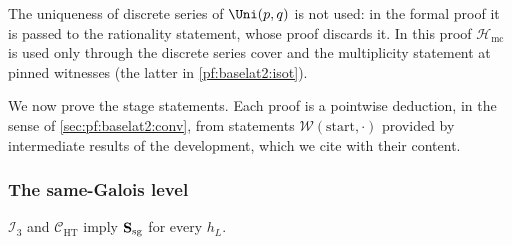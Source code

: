 \begin{remark}\label{pf:baselat2:rem:upq}
The uniqueness of discrete series of $\Uni(p,q)$ is not used: in the formal proof it is passed to the
rationality statement, whose proof discards it. In this proof $\mathcal{H}_{\mathrm{mc}}$ is used only through
the discrete series cover and the multiplicity statement at pinned witnesses (the latter in
\cref{pf:baselat2:isot}).
\end{remark}

We now prove the stage statements. Each proof is a pointwise deduction, in the sense of
\cref{sec:pf:baselat2:conv}, from statements $\mathcal{W}(\mathrm{start},\cdot)$ provided by intermediate
results of the development, which we cite with their content.

\subsubsection{The same-Galois level}

\begin{proposition}\label{pf:baselat2:sa}
$\mathcal{I}_3$ and $\mathcal{C}_{\mathrm{HT}}$ imply $\mathbf{S}_{\mathrm{sg}}$ for every
$h_L$.
\end{proposition}

